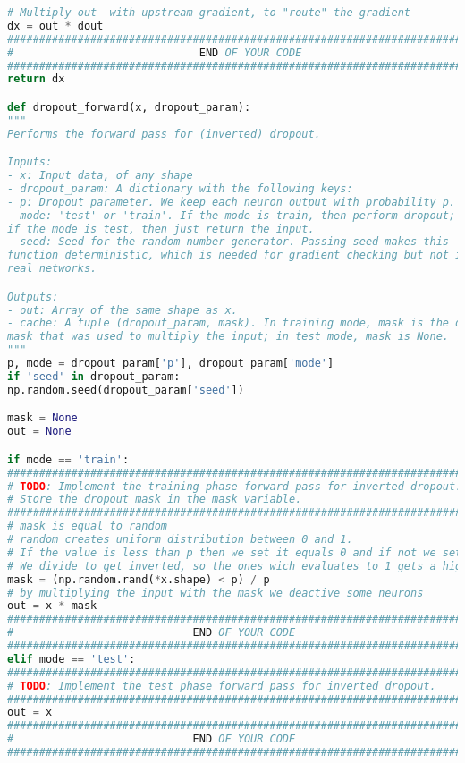 \begin{lstlisting}[language=Python, label=lst:layers.py, caption={layers.py}, basicstyle=\tiny]
# Multiply out  with upstream gradient, to "route" the gradient
dx = out * dout
#############################################################################
#                             END OF YOUR CODE                              #
#############################################################################
return dx

def dropout_forward(x, dropout_param):
"""
Performs the forward pass for (inverted) dropout.

Inputs:
- x: Input data, of any shape
- dropout_param: A dictionary with the following keys:
- p: Dropout parameter. We keep each neuron output with probability p.
- mode: 'test' or 'train'. If the mode is train, then perform dropout;
if the mode is test, then just return the input.
- seed: Seed for the random number generator. Passing seed makes this
function deterministic, which is needed for gradient checking but not in
real networks.

Outputs:
- out: Array of the same shape as x.
- cache: A tuple (dropout_param, mask). In training mode, mask is the dropout
mask that was used to multiply the input; in test mode, mask is None.
"""
p, mode = dropout_param['p'], dropout_param['mode']
if 'seed' in dropout_param:
np.random.seed(dropout_param['seed'])

mask = None
out = None

if mode == 'train':
###########################################################################
# TODO: Implement the training phase forward pass for inverted dropout.   #
# Store the dropout mask in the mask variable.                            #
###########################################################################
# mask is equal to random 
# random creates uniform distribution between 0 and 1.
# If the value is less than p then we set it equals 0 and if not we set it equals 1
# We divide to get inverted, so the ones wich evaluates to 1 gets a higher value
mask = (np.random.rand(*x.shape) < p) / p
# by multiplying the input with the mask we deactive some neurons
out = x * mask
###########################################################################
#                            END OF YOUR CODE                             #
###########################################################################
elif mode == 'test':
###########################################################################
# TODO: Implement the test phase forward pass for inverted dropout.       #
###########################################################################
out = x
###########################################################################
#                            END OF YOUR CODE                             #
###########################################################################


\end{lstlisting}
